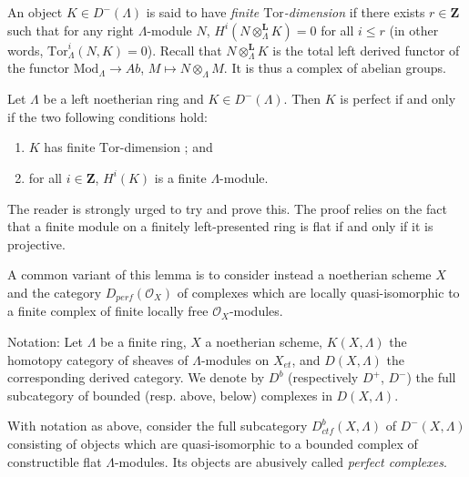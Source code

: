 \begin{definition}
\label{definition-finite-tor-dimension}
An object $K\in D^-(\Lambda)$ is said to have
{\it finite $\text{Tor}$-dimension}
if there exists $r\in \mathbf{Z}$ such that for any
right $\Lambda$-module $N$, $H^i(N\otimes_{\Lambda}^\mathbf{L} K) = 0$ for all
$i \leq r$ (in other words, $\text{Tor}^i_\Lambda (N, K) = 0$). Recall that
$N\otimes^\mathbf{L}_{\Lambda}K$ is the total left derived functor of the
functor $\text{Mod}_{\Lambda} \to \textit{Ab}$,
$M \mapsto N\otimes_{\Lambda} M$.
It is thus a complex of abelian groups.
\end{definition}

\begin{lemma}
\label{lemma-characterize-perfect}
Let $\Lambda$ be a left noetherian ring and $K\in D^-(\Lambda)$. Then $K$ is
perfect if and only if the two following conditions hold:
\begin{enumerate}
\item
$K$ has finite $\text{Tor}$-dimension ; and
\item
for all $i \in \mathbf{Z}$, $H^i(K)$ is a finite $\Lambda$-module.
\end{enumerate}
\end{lemma}

\noindent
The reader is strongly urged to try and prove this. The proof relies on the
fact that a finite module on a finitely left-presented ring is flat if and only
if it is projective.

\begin{remark}
\label{remark-variant}
A common variant of this lemma is to consider instead a noetherian scheme $X$
and the category $D_{perf}(\mathcal{O}_X)$ of complexes which are locally
quasi-isomorphic to a finite complex of finite locally free
$\mathcal{O}_X$-modules.
\end{remark}

\noindent
Notation: Let $\Lambda$ be a finite ring, $X$ a noetherian scheme,
$K(X, \Lambda)$ the
homotopy category of sheaves of $\Lambda$-modules on $X_{et}$, and
$D(X, \Lambda)$ the corresponding derived category. We denote by $D^b$
(respectively $D^+$, $D^-$) the full subcategory of bounded
(resp. above, below) complexes in $D(X, \Lambda)$.

\begin{definition}
\label{definition-ctf}
With notation as above,
consider the full subcategory $D_{ctf}^b (X, \Lambda)$ of $D^-(X, \Lambda)$
consisting of objects which are quasi-isomorphic to a bounded complex of
constructible flat $\Lambda$-modules. Its objects are abusively called
{\it perfect complexes}.
\end{definition}

